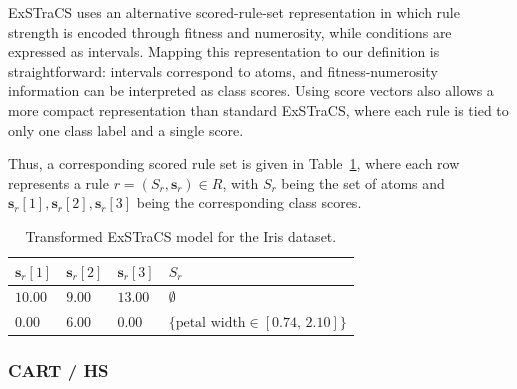\documentclass[a4paper,twoside]{article}
\begin{document}
ExSTraCS uses an alternative scored-rule-set representation in which rule strength is encoded through fitness and numerosity, while conditions are expressed as intervals. Mapping this representation to our definition is straightforward: intervals correspond to atoms, and fitness-numerosity information can be interpreted as class scores. Using score vectors also allows a more compact representation than standard ExSTraCS, where each rule is tied to only one class label and a single score.
  
Thus, a corresponding scored rule set is given in Table~\ref{tab:exstracs_iris_example_transformed}, where each row represents a rule $r = (S_r, \mathbf{s}_r) \in R$, with $S_r$ being the set of atoms and $\mathbf{s}_r[1], \mathbf{s}_r[2], \mathbf{s}_r[3]$ being the corresponding class scores.

\begin{table}
   \centering
  \caption{Transformed ExSTraCS model for the Iris dataset.}
   \label{tab:exstracs_iris_example_transformed}
   \begin{tabular}{p{0.6cm} p{0.6cm} p{0.6cm} p{4.2cm}}
      \toprule
      $\mathbf{s}_r[1]$ & $\mathbf{s}_r[2]$ & $\mathbf{s}_r[3]$ & $S_r$ \\
      \midrule
      $10.00$ & $9.00$ & $13.00$ & $\emptyset$ \\
      $0.00$ & $6.00$ & $0.00$ & $\{\text{petal width} \in [0.74,\,2.10]\}$ \\
      \bottomrule
   \end{tabular}
\end{table}

  

\subsubsection{CART / HS}
\end{document}
